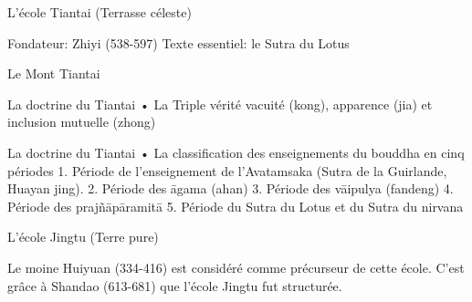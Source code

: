 L’école Tiantai (Terrasse céleste)




Fondateur: Zhiyi (538-597)
Texte essentiel: le Sutra du Lotus
 

Le Mont Tiantai
 
La doctrine du Tiantai
•	La Triple vérité
vacuité (kong), apparence (jia) et inclusion mutuelle (zhong)
 
La doctrine du Tiantai
•	La classification des enseignements du bouddha en cinq périodes
1.	Période de l’enseignement de l’Avatamsaka (Sutra de la Guirlande, Huayan jing).
2.	Période des āgama (ahan)
3.	Période des vāipulya (fandeng)
4.	Période des prajñāpāramitā
5.	Période du Sutra du Lotus et du Sutra du nirvana
 


L’école Jingtu (Terre pure)



Le moine Huiyuan (334-416) est considéré comme précurseur de cette école.
C’est grâce à Shandao (613-681) que l’école Jingtu fut structurée.

